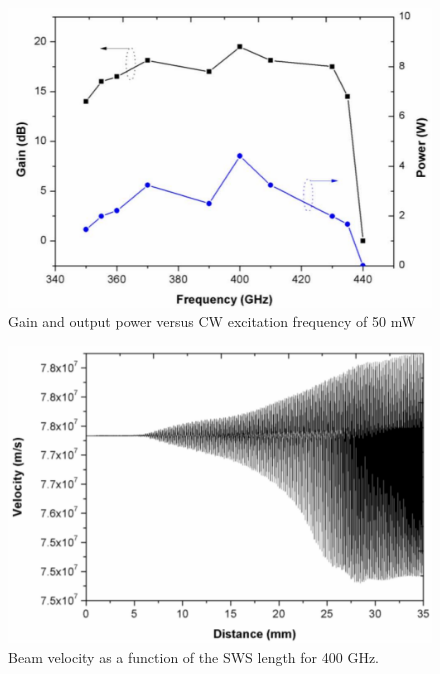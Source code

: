 \documentclass[10pt,a4paper,UTF8]{ctexart}
\begin{document}
\begin{figure}[phtb]
	\centering
	\includegraphics[width=0.95\linewidth]{figure/fig10}
	\caption{Gain and output power versus CW excitation frequency of 50 mW}
	\label{fig10}
\end{figure}


\begin{figure}[H]
	\centering
	\includegraphics[width=0.95\linewidth]{figure/fig11}
	\caption{Beam velocity as a function of the SWS length for 400 GHz.}
	\label{fig11}
\end{figure}
\end{document}
